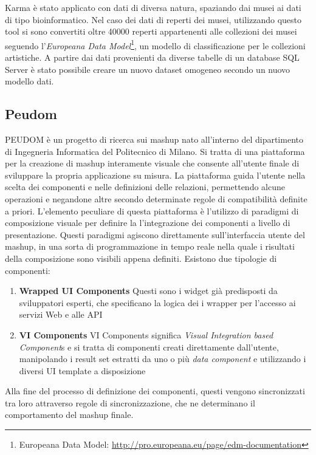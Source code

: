 Karma è stato applicato con dati di diversa natura, spaziando dai musei ai dati di tipo bioinformatico. 
Nel caso dei dati di reperti dei musei, utilizzando questo tool si sono convertiti oltre 40000 reperti appartenenti alle collezioni dei musei seguendo l'\emph{Europeana Data Model}\footnote{Europeana Data Model: \url{http://pro.europeana.eu/page/edm-documentation}}, un modello di classificazione per le collezioni artistiche. A partire dai dati provenienti da diverse tabelle di un database SQL Server è stato possibile creare un nuovo dataset omogeneo secondo un nuovo modello dati. 

\subsection*{Peudom}

PEUDOM \cite{Cappiello:2015:UAE:2788341.2735632} è un progetto di ricerca sui mashup nato all'interno del dipartimento di Ingegneria Informatica del Politecnico di Milano. Si tratta di una piattaforma per la creazione di mashup interamente visuale che consente all'utente finale di sviluppare la propria applicazione su misura. La piattaforma guida l'utente nella scelta dei componenti e nelle definizioni delle relazioni, permettendo alcune operazioni e negandone altre secondo determinate regole di compatibilità definite a priori.
L'elemento peculiare di questa piattaforma è l'utilizzo di paradigmi di composizione visuale per definire la l'integrazione dei componenti a livello di presentazione. Questi paradigmi agiscono direttamente sull'interfaccia utente del mashup, in una sorta di programmazione in tempo reale nella quale i risultati della composizione sono visibili appena definiti.
Esistono due tipologie di componenti:

\begin{enumerate}
	\item \textbf{Wrapped UI Components}
	Questi sono i widget già predisposti da sviluppatori esperti, che specificano la logica dei i wrapper per l'accesso ai servizi Web e alle API
	\item \textbf{VI Components}
	VI Components significa \emph{Visual Integration based Component}s e si tratta di componenti creati direttamente dall'utente, manipolando i result set estratti da uno o più \emph{data component} e utilizzando i diversi UI template a disposizione
\end{enumerate}

Alla fine del processo di definizione dei componenti, questi vengono sincronizzati tra loro attraverso regole di sincronizzazione, che ne determinano il comportamento del mashup finale.


